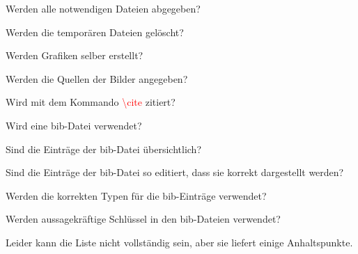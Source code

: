 \begin{todolist}
    \item  Werden alle notwendigen Dateien abgegeben?
    \item Werden die temporären Dateien gelöscht?
    \item Werden Grafiken selber erstellt?
    \item Werden die Quellen der Bilder angegeben?
    \item Wird mit dem Kommando \textcolor{red}{\textbackslash cite} zitiert?
    \item Wird eine bib-Datei verwendet?
    \item Sind die Einträge der bib-Datei übersichtlich? 
    \item Sind die Einträge der bib-Datei so editiert, dass sie korrekt dargestellt werden?
    \item Werden die korrekten Typen für die bib-Einträge verwendet?
    \item Werden aussagekräftige Schlüssel in den bib-Dateien verwendet?
  \end{todolist}

\bigskip

Leider kann die Liste nicht vollständig sein, aber sie liefert einige Anhaltspunkte.